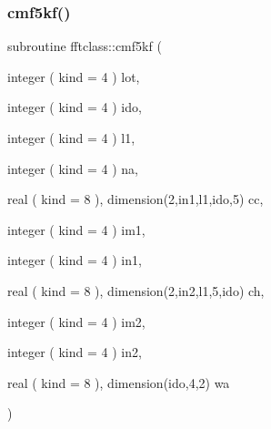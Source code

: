 \mbox{\label{namespacefftclass_a59cb57b66516dd0b08cf36e366933c56}} 
\subsubsection{\texorpdfstring{cmf5kf()}{cmf5kf()}}
{\footnotesize\ttfamily subroutine fftclass\+::cmf5kf (\begin{DoxyParamCaption}\item[{integer ( kind = 4 )}]{lot,  }\item[{integer ( kind = 4 )}]{ido,  }\item[{integer ( kind = 4 )}]{l1,  }\item[{integer ( kind = 4 )}]{na,  }\item[{real ( kind = 8 ), dimension(2,in1,l1,ido,5)}]{cc,  }\item[{integer ( kind = 4 )}]{im1,  }\item[{integer ( kind = 4 )}]{in1,  }\item[{real ( kind = 8 ), dimension(2,in2,l1,5,ido)}]{ch,  }\item[{integer ( kind = 4 )}]{im2,  }\item[{integer ( kind = 4 )}]{in2,  }\item[{real ( kind = 8 ), dimension(ido,4,2)}]{wa }\end{DoxyParamCaption})}

\mbox{\label{namespacefftclass_ab1c60a144232626a03fad4dd30f88d7d}} 
